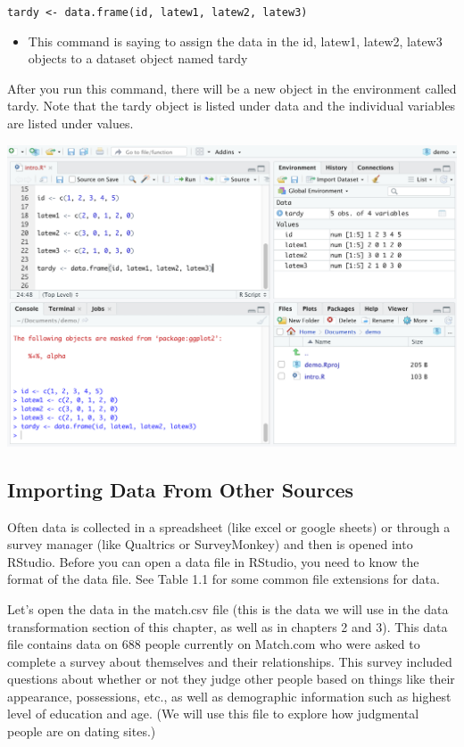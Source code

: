 \documentclass[
]{book}
\providecommand{\tightlist}{%
  \setlength{\itemsep}{0pt}\setlength{\parskip}{0pt}}
\begin{document}
\texttt{tardy\ \textless{}-\ data.frame(id,\ latew1,\ latew2,\ latew3)}

\begin{itemize}
\tightlist
\item
  This command is saying to assign the data in the id, latew1, latew2, latew3 objects to a dataset object named tardy
\end{itemize}

After you run this command, there will be a new object in the environment called tardy. Note that the tardy object is listed under data and the individual variables are listed under values.

\includegraphics{img/DATA THINGS 1R4.png}

\hypertarget{importing-data-from-other-sources}{%
\subsection{Importing Data From Other Sources}\label{importing-data-from-other-sources}}

Often data is collected in a spreadsheet (like excel or google sheets) or through a survey manager (like Qualtrics or SurveyMonkey) and then is opened into RStudio. Before you can open a data file in RStudio, you need to know the format of the data file. See Table 1.1 for some common file extensions for data.

Let's open the data in the match.csv file (this is the data we will use in the data transformation section of this chapter, as well as in chapters 2 and 3). This data file contains data on 688 people currently on Match.com who were asked to complete a survey about themselves and their relationships. This survey included questions about whether or not they judge other people based on things like their appearance, possessions, etc., as well as demographic information such as highest level of education and age. (We will use this file to explore how judgmental people are on dating sites.)
\end{document}
